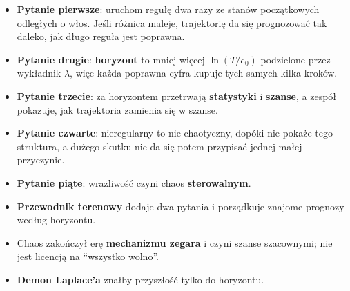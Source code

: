\begin{summarybox}
\begin{itemize}
\item \textbf{Pytanie pierwsze}: uruchom regułę dwa razy ze stanów
  początkowych odległych o włos. Jeśli różnica maleje, trajektorię da się
  prognozować tak daleko, jak długo reguła jest poprawna.
\item \textbf{Pytanie drugie}: \textbf{horyzont} to mniej więcej
  $\ln(T/e_0)$ podzielone przez wykładnik $\lambda$, więc każda poprawna
  cyfra kupuje tych samych kilka kroków.
\item \textbf{Pytanie trzecie}: za horyzontem przetrwają
  \textbf{statystyki} i \textbf{szanse}, a zespół pokazuje, jak trajektoria
  zamienia się w szanse.
\item \textbf{Pytanie czwarte}: nieregularny to nie chaotyczny, dopóki nie
  pokaże tego struktura, a dużego skutku nie da się potem przypisać jednej
  małej przyczynie.
\item \textbf{Pytanie piąte}: wrażliwość czyni chaos
  \textbf{sterowalnym}.
\item \textbf{Przewodnik terenowy} dodaje dwa pytania i porządkuje znajome
  prognozy według horyzontu.
\item Chaos zakończył erę \textbf{mechanizmu zegara} i czyni szanse
  szacownymi; nie jest licencją na \enquote{wszystko wolno}.
\item \textbf{Demon Laplace'a} znałby przyszłość tylko do horyzontu.
\end{itemize}
\end{summarybox}

\canyou

